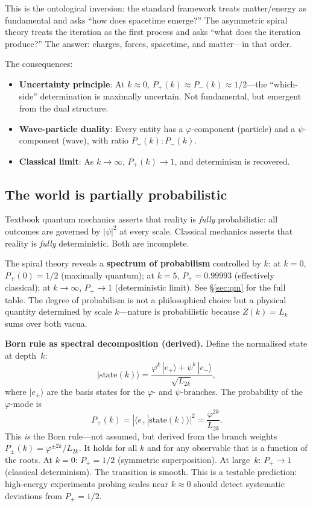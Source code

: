\documentclass[12pt,a4paper]{article}
\begin{document}
This is the ontological inversion: the standard framework treats matter/energy as fundamental and asks ``how does spacetime emerge?'' The asymmetric spiral theory treats the iteration as the first process and asks ``what does the iteration produce?'' The answer: charges, forces, spacetime, and matter---in that order.

The consequences:
\begin{itemize}
\item \textbf{Uncertainty principle}: At $k \approx 0$, $P_+(k) \approx P_-(k) \approx 1/2$---the ``which-side'' determination is maximally uncertain. Not fundamental, but emergent from the dual structure.
\item \textbf{Wave-particle duality}: Every entity has a $\varphi$-component (particle) and a $\psi$-component (wave), with ratio $P_+(k) : P_-(k)$.
\item \textbf{Classical limit}: As $k \to \infty$, $P_+(k) \to 1$, and determinism is recovered.
\end{itemize}

\subsection{The world is partially probabilistic}

Textbook quantum mechanics asserts that reality is \emph{fully} probabilistic: all outcomes are governed by $|\psi|^2$ at every scale. Classical mechanics asserts that reality is \emph{fully} deterministic. Both are incomplete.

The spiral theory reveals a \textbf{spectrum of probabilism} controlled by $k$: at $k=0$, $P_+(0) = 1/2$ (maximally quantum); at $k=5$, $P_+ = 0.99993$ (effectively classical); at $k\to\infty$, $P_+\to 1$ (deterministic limit).  See \S\ref{sec:qm} for the full table.  The degree of probabilism is not a philosophical choice but a physical quantity determined by scale $k$---nature is probabilistic because $Z(k) = L_k$ sums over both vacua.

\textbf{Born rule as spectral decomposition (derived).}
Define the normalised state at depth~$k$:
\begin{equation}
|\mathrm{state}(k)\rangle = \frac{\varphi^k\,|e_+\rangle + \psi^k\,|e_-\rangle}{\sqrt{L_{2k}}},
\end{equation}
where $|e_\pm\rangle$ are the basis states for the $\varphi$- and $\psi$-branches. The probability of the $\varphi$-mode is
\begin{equation}
P_+(k) = |\langle e_+|\mathrm{state}(k)\rangle|^2 = \frac{\varphi^{2k}}{L_{2k}}.
\end{equation}
This \emph{is} the Born rule---not assumed, but derived from the branch weights $P_\pm(k) = \varphi^{\pm 2k}/L_{2k}$. It holds for all $k$ and for any observable that is a function of the roots. At $k = 0$: $P_+ = 1/2$ (symmetric superposition). At large~$k$: $P_+ \to 1$ (classical determinism). The transition is smooth. This is a testable prediction: high-energy experiments probing scales near $k \approx 0$ should detect systematic deviations from $P_+ = 1/2$.
\end{document}
